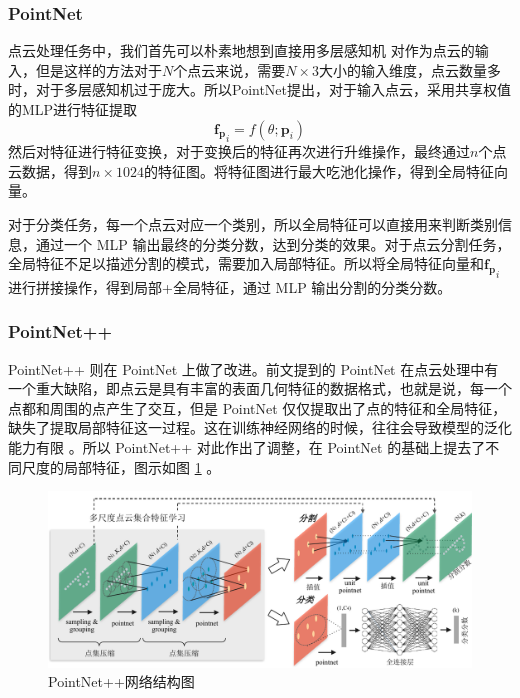 \subsubsection{PointNet}
点云处理任务中，我们首先可以朴素地想到直接用多层感知机\cite{lecun2015deep} 对作为点云的输入，但是这样的方法对于$N$个点云来说，需要$N \times 3$大小的输入维度，点云数量多时，对于多层感知机过于庞大。所以PointNet提出，对于输入点云，采用共享权值的MLP进行特征提取
\begin{equation}
    \boldsymbol{f_p}_i = f(\theta; \boldsymbol{p}_i)
\end{equation}
然后对特征进行特征变换，对于变换后的特征再次进行升维操作，最终通过$n$个点云数据，得到$n \times 1024$的特征图。将特征图进行最大吃池化操作，得到全局特征向量。

对于分类任务，每一个点云对应一个类别，所以全局特征可以直接用来判断类别信息，通过一个 MLP 输出最终的分类分数，达到分类的效果。对于点云分割任务，全局特征不足以描述分割的模式，需要加入局部特征。所以将全局特征向量和$\boldsymbol{f_p}_i$进行拼接操作，得到局部+全局特征，通过 MLP 输出分割的分类分数。

\subsubsection{PointNet++}
PointNet++\cite{qi2017pointnet++} 则在 PointNet 上做了改进。前文提到的 PointNet 在点云处理中有一个重大缺陷，即点云是具有丰富的表面几何特征的数据格式，也就是说，每一个点都和周围的点产生了交互，但是 PointNet 仅仅提取出了点的特征和全局特征，缺失了提取局部特征这一过程。这在训练神经网络的时候，往往会导致模型的泛化能力有限\cite{qi2017pointnet++} 。所以 PointNet++ 对此作出了调整，在 PointNet 的基础上提去了不同尺度的局部特征，图示如图 \ref{fig:pointnet++} 。

\begin{figure}
    \centering
    \includegraphics[width=\linewidth]{images/pointnet++.pdf}
    \caption{PointNet++\cite{qi2017pointnet++}网络结构图}
    \label{fig:pointnet++}
    \vspace{-5mm}
\end{figure}

